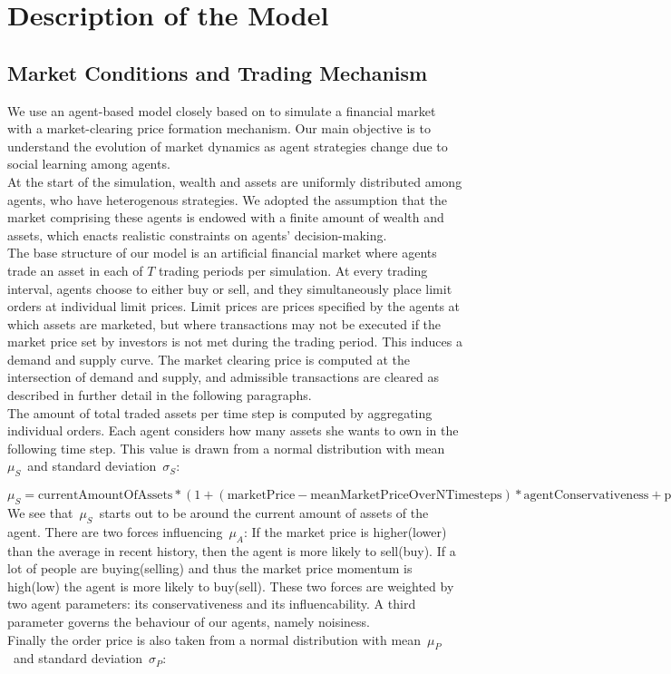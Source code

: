 \documentclass[11pt]{article}
\begin{document}
\section{Description of the Model}

\subsection{Market Conditions and Trading Mechanism}
We use an agent-based model closely based on \citet{raberto2001agent} to simulate a financial market with a market-clearing price formation mechanism. Our main objective is to understand the evolution of market dynamics as agent strategies change due to social learning among agents. \\
At the start of the simulation, wealth and assets are uniformly distributed among agents, who have heterogenous strategies. We adopted the assumption that the market comprising these agents is endowed with a finite amount of wealth and assets, which enacts realistic constraints on agents' decision-making. \\
The base structure of our model is an artificial financial market where agents trade an asset in each of $T$ trading periods per simulation. At every trading interval, agents choose to either buy or sell, and they simultaneously place limit orders at individual limit prices. Limit prices are prices specified by the agents at which assets are marketed, but where transactions may not be executed if the market price set by investors is not met during the trading period. This induces a demand and supply curve. The market clearing price is computed at the intersection of demand and supply, and admissible transactions are cleared as described in further detail in the following paragraphs. \\
The amount of total traded assets per time step is computed by aggregating individual orders. Each agent considers how many assets she wants to own in the following time step. This value is drawn from a normal distribution with mean $\mu_S$ and standard deviation $\sigma_S$:

\begin{equation}
\mu_S = \text{currentAmountOfAssets} * (1 + (\text{marketPrice} - \text{meanMarketPriceOverNTimesteps}) * \text{agentConservativeness} + \text{priceMomentum} * \text{agentInfluencability}, \sigma_S = \text{agentNoisiness})
\end{equation}
We see that $\mu_S$ starts out to be around the current amount of assets of the agent. There are two forces influencing $\mu_A$: If the market price is higher(lower) than the average in recent history, then the agent is more likely to sell(buy). If a lot of people are buying(selling) and thus the market price momentum is high(low) the agent is more likely to buy(sell). These two forces are weighted by two agent parameters: its conservativeness and its influencability. A third parameter governs the behaviour of our agents, namely  noisiness.\\
Finally the order price is also taken from a normal distribution with mean $\mu_P$ and standard deviation $\sigma_P$:
\end{document}
